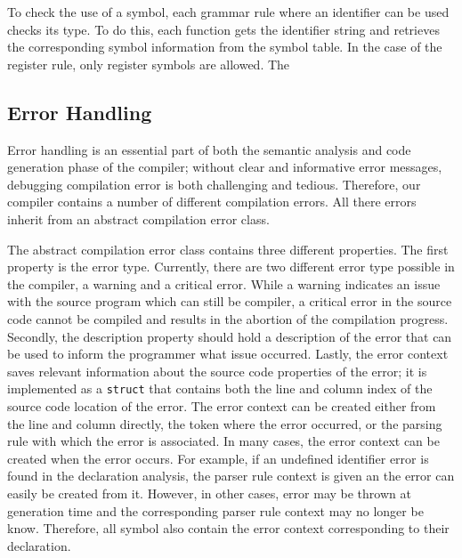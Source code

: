 To check the use of a symbol, each grammar rule where an identifier can be used checks its type. To do this, each function gets the identifier string and retrieves the corresponding symbol information from the symbol table. In the case of the register rule, only register symbols are allowed. The 

\subsection{Error Handling}
\label{sec:implementation_semanticAnalayis_errorHandling}
Error handling is an essential part of both the semantic analysis and code generation phase of the compiler; without clear and informative error messages, debugging compilation error is both challenging and tedious. Therefore, our compiler contains a number of different compilation errors. All there errors inherit from an abstract compilation error class. 

The abstract compilation error class contains three different properties. The first property is the error type. Currently, there are two different error type possible in the compiler, a warning and a critical error. While a warning indicates an issue with the source program which can still be compiler, a critical error in the source code cannot be compiled and results in the abortion of the compilation progress. Secondly, the description property should hold a description of the error that can be used to inform the programmer what issue occurred. Lastly, the error context saves relevant information about the source code properties of the error; it is implemented as a \texttt{struct} that contains both the line and column index of the source code location of the error. The error context can be created either from the line and column directly, the token where the error occurred, or the parsing rule with which the error is associated. In many cases, the error context can be created when the error occurs. For example, if an undefined identifier error is found in the declaration analysis, the parser rule context is given an the error can easily be created from it. However, in other cases, error may be thrown at generation time and the corresponding parser rule context may no longer be know. Therefore, all symbol also contain the error context corresponding to their declaration. 

